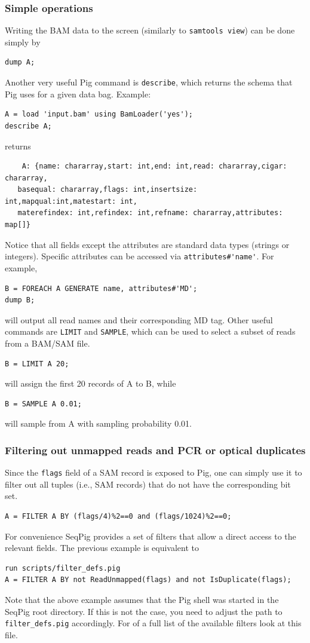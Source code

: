 \subsubsection{Simple operations}

Writing the BAM data to the screen (similarly to {\tt samtools view})
can be done simply by
\begin{lstlisting}
dump A;
\end{lstlisting}
Another very useful Pig command is {\tt describe}, which returns the schema that Pig
uses for a given data bag. Example:
\begin{lstlisting}
A = load 'input.bam' using BamLoader('yes');
describe A;
\end{lstlisting}
returns
\begin{lstlisting}  
	A: {name: chararray,start: int,end: int,read: chararray,cigar: chararray,
   basequal: chararray,flags: int,insertsize: int,mapqual:int,matestart: int,
   materefindex: int,refindex: int,refname: chararray,attributes: map[]}
\end{lstlisting}
Notice that all fields except the attributes are standard data types (strings
or integers). Specific attributes can be accessed via \verb|attributes#'name'|. For
example,
\begin{lstlisting} 
B = FOREACH A GENERATE name, attributes#'MD';
dump B;
\end{lstlisting}
will output all read names and their corresponding MD tag.
Other useful commands are {\tt LIMIT} and {\tt SAMPLE}, which can be used to
select a subset of reads from a BAM/SAM file.
\begin{lstlisting} 
B = LIMIT A 20;
\end{lstlisting}
will assign the first 20 records of A to B, while
\begin{lstlisting}
B = SAMPLE A 0.01;
\end{lstlisting}
will sample from A with sampling probability 0.01.

\subsubsection{Filtering out unmapped reads and PCR or optical duplicates}
\label{subsubsect:flagsfiltering}
Since the {\tt flags} field of a SAM record is exposed to Pig, one can simply
use it to filter out all tuples (i.e., SAM records) that do not have the
corresponding bit set.
\begin{lstlisting}
A = FILTER A BY (flags/4)%2==0 and (flags/1024)%2==0;
\end{lstlisting}
For convenience SeqPig provides a set of filters that allow a direct access
to the relevant fields. The previous example is equivalent to
\begin{lstlisting}
run scripts/filter_defs.pig
A = FILTER A BY not ReadUnmapped(flags) and not IsDuplicate(flags);
\end{lstlisting}
Note that the above example assumes that the Pig shell was started in
the SeqPig root directory. If this is not the case, you need to adjust
the path to {\tt filter\_defs.pig} accordingly. For of a full list of
the available filters look at this file.

